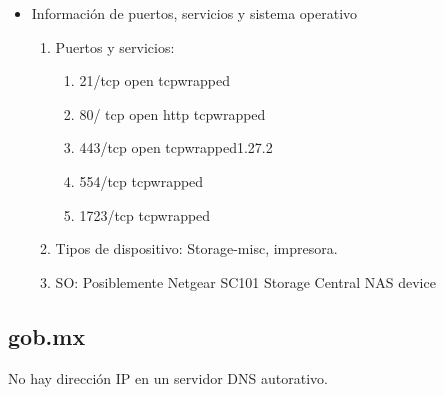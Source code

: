 \begin{enumerate}
\begin{itemize}
        \item Información de puertos, servicios y sistema operativo
        
        \begin{enumerate}
            \item Puertos y servicios:
            \begin{enumerate}
                \item 21/tcp open tcpwrapped
                \item 80/ tcp open http tcpwrapped
                \item 443/tcp open tcpwrapped1.27.2
                \item 554/tcp tcpwrapped
                \item 1723/tcp tcpwrapped 
            \end{enumerate}

            \item Tipos de dispositivo: Storage-misc, impresora.
            \item SO: Posiblemente Netgear SC101 Storage Central NAS device
        \end{enumerate}
    \end{itemize}
\end{enumerate}


\subsection{gob.mx}

No hay dirección IP en un servidor DNS autorativo.
